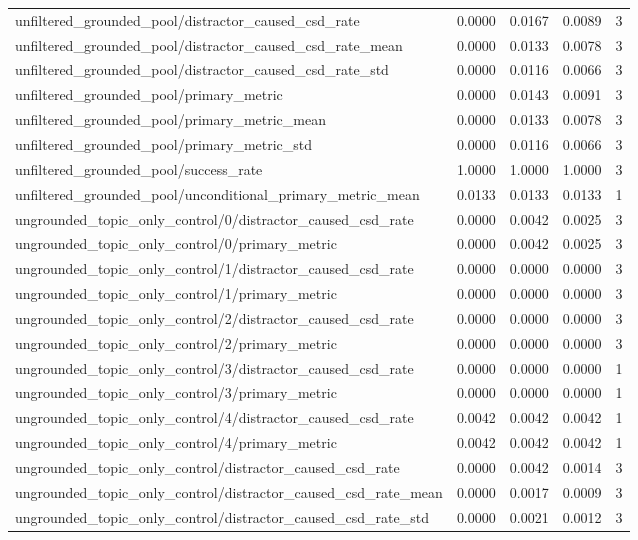 \begin{table}[h]
\begin{tabular}{lrrrr}
unfiltered_grounded_pool/distractor_caused_csd_rate & 0.0000 & 0.0167 & 0.0089 & 3 \\
unfiltered_grounded_pool/distractor_caused_csd_rate_mean & 0.0000 & 0.0133 & 0.0078 & 3 \\
unfiltered_grounded_pool/distractor_caused_csd_rate_std & 0.0000 & 0.0116 & 0.0066 & 3 \\
unfiltered_grounded_pool/primary_metric & 0.0000 & 0.0143 & 0.0091 & 3 \\
unfiltered_grounded_pool/primary_metric_mean & 0.0000 & 0.0133 & 0.0078 & 3 \\
unfiltered_grounded_pool/primary_metric_std & 0.0000 & 0.0116 & 0.0066 & 3 \\
unfiltered_grounded_pool/success_rate & 1.0000 & 1.0000 & 1.0000 & 3 \\
unfiltered_grounded_pool/unconditional_primary_metric_mean & 0.0133 & 0.0133 & 0.0133 & 1 \\
ungrounded_topic_only_control/0/distractor_caused_csd_rate & 0.0000 & 0.0042 & 0.0025 & 3 \\
ungrounded_topic_only_control/0/primary_metric & 0.0000 & 0.0042 & 0.0025 & 3 \\
ungrounded_topic_only_control/1/distractor_caused_csd_rate & 0.0000 & 0.0000 & 0.0000 & 3 \\
ungrounded_topic_only_control/1/primary_metric & 0.0000 & 0.0000 & 0.0000 & 3 \\
ungrounded_topic_only_control/2/distractor_caused_csd_rate & 0.0000 & 0.0000 & 0.0000 & 3 \\
ungrounded_topic_only_control/2/primary_metric & 0.0000 & 0.0000 & 0.0000 & 3 \\
ungrounded_topic_only_control/3/distractor_caused_csd_rate & 0.0000 & 0.0000 & 0.0000 & 1 \\
ungrounded_topic_only_control/3/primary_metric & 0.0000 & 0.0000 & 0.0000 & 1 \\
ungrounded_topic_only_control/4/distractor_caused_csd_rate & 0.0042 & 0.0042 & 0.0042 & 1 \\
ungrounded_topic_only_control/4/primary_metric & 0.0042 & 0.0042 & 0.0042 & 1 \\
ungrounded_topic_only_control/distractor_caused_csd_rate & 0.0000 & 0.0042 & 0.0014 & 3 \\
ungrounded_topic_only_control/distractor_caused_csd_rate_mean & 0.0000 & 0.0017 & 0.0009 & 3 \\
ungrounded_topic_only_control/distractor_caused_csd_rate_std & 0.0000 & 0.0021 & 0.0012 & 3 \\

\end{tabular}
\end{table}
